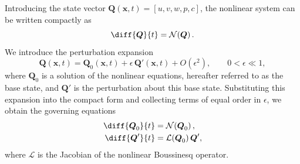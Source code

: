 Introducing the state vector \(\boldsymbol{Q}(\boldsymbol{x},t) = \left[ u, v, w, p, c \right]\), the nonlinear system can be written compactly as
\begin{equation}
    \label{eq:compact_nl_continuous}
    \diff{\boldsymbol{Q}}{t} = \mathcal{N}\!\left( \boldsymbol{Q} \right).
\end{equation}
We introduce the perturbation expansion
\begin{equation}
    \label{eq:perturbation_expansion}
    \boldsymbol{Q}(\boldsymbol{x},t) = \boldsymbol{Q}_0(\boldsymbol{x},t) + \epsilon\,\boldsymbol{Q}'(\boldsymbol{x},t) + O(\epsilon^2),
    \qquad 0 < \epsilon \ll 1,
\end{equation}
where \(\boldsymbol{Q}_0\) is a solution of the nonlinear equations, hereafter referred to as the base state, and \(\boldsymbol{Q}'\) is the perturbation about this base state. Substituting this expansion into the compact form and collecting terms of equal order in \(\epsilon\), we obtain the governing equations
\begin{subequations}
    \label{eq:compact_lin_continuous}
    \begin{align}
        \label{eq:compact_lin_continuous_0th}
        \diff{\boldsymbol{Q}_0}{t} &= \mathcal{N}\!\left( \boldsymbol{Q}_0 \right), \\
        \label{eq:compact_lin_continuous_1th}
        \diff{\boldsymbol{Q}'}{t} &= \mathcal{L}(\boldsymbol{Q}_0)\,\boldsymbol{Q}',
    \end{align}
\end{subequations}
where \(\mathcal{L}\) is the Jacobian of the nonlinear Boussinesq operator.

